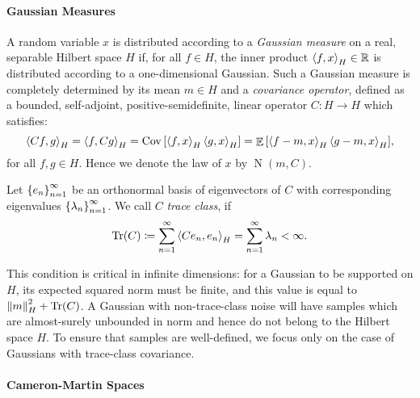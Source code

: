 

\paragraph{Gaussian Measures}
A random variable \(x\) is distributed according to a \textit{Gaussian measure}  on a real, separable Hilbert space \(H\) if, for all \(f \in H\), the inner product \(\ev{f, x}_{H} \in \mathbb{R}\) is distributed according to a one-dimensional Gaussian. Such a Gaussian measure is completely determined by its mean \(m \in H\) and a \textit{covariance operator}, defined as a bounded, self-adjoint, positive-semidefinite, linear operator \(C : H \to H\) which satisfies:
\[
  \ev{Cf, g}_{H} = \ev{f, Cg}_{H} = \operatorname{Cov}\qty[\ev{f, x}_{H} \ev{g, x}_{H}] = \mathop{\mathbb{E}}\qty[\ev{f - m, x}_{H} \ev{g - m, x}_{H}],
\]
for all \(f, g \in H\). Hence we denote the law of \(x\) by \(\operatorname{N}(m, C)\).

Let \(\qty{e_{n}}_{n=1}^{\infty}\) be an orthonormal basis of eigenvectors of \(C\) with corresponding eigenvalues \(\qty{\lambda_{n}}_{n=1}^{\infty}\). We call \(C\) \textit{trace class}, if
\[
  \operatorname{Tr}(C) \coloneqq \sum_{n=1}^{\infty} \ev{C e_{n}, e_{n}}_{H} = \sum_{n=1}^{\infty} \lambda_{n} < \infty.
\]

This condition is critical in infinite dimensions: for a Gaussian to be supported on \(H\), its expected squared norm must be finite, and this value is equal to \(\norm{m}^{2}_{H} + \operatorname{Tr}(C)\). A Gaussian with non-trace-class noise will have samples which are almost-surely unbounded in norm and hence do not belong to the Hilbert space \(H\). To ensure that samples are well-defined, we focus only on the case of Gaussians with trace-class covariance.

\paragraph{Cameron-Martin Spaces}

